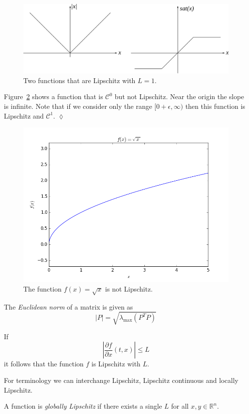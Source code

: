 \begin{figure}[ht!]
\centering
\includegraphics[width=.7\textwidth]{images/05lip}
\caption{Two functions that are Lipschitz with $L=1$.}
\label{fig:05lip}
\end{figure}

\begin{example}
Figure~\ref{fig:05notlip} shows a function that is $\mathcal{C}^0$ but not Lipschitz.
Near the origin the slope is infinite.
Note that if we consider only the range $[0+\epsilon,\infty)$ then this function is Lipschitz and $\mathcal{C}^1$.%
$\lozenge$
\end{example}

\begin{figure}[ht!]
\centering
\includegraphics[width=.5\textwidth]{images/plotSqrtX}
\caption{The function $f(x) = \sqrt{x}$ is not Lipschitz.}
\label{fig:05notlip}
\end{figure}

\begin{definition}
The \textit{Euclidean norm} of a matrix is given as
$$|P| = \sqrt{\lambda_{\text{max}}(P^T P)}$$
\end{definition}

\begin{lemma}
If
$$\left|\frac{\partial f}{\partial x}(t,x)\right| \leq L$$
it follows that the function $f$ is Lipschitz with $L$.
\end{lemma}
For terminology we can interchange Lipschitz, Lipschitz continuous and locally Lipschitz.

\begin{definition}
A function is \textit{globally Lipschitz} if there exists a single $L$ for all $x,y\in\mathbb{R}^n$.
\end{definition}

